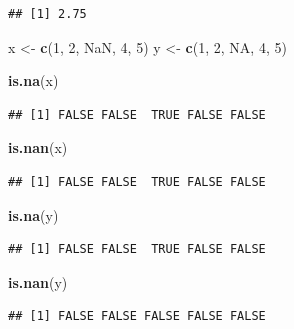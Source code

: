 \documentclass[
]{book}
\newenvironment{Shaded}{\begin{snugshade}}{\end{snugshade}}
\newcommand{\ConstantTok}[1]{\textcolor[rgb]{0.56,0.35,0.01}{#1}}
\newcommand{\DecValTok}[1]{\textcolor[rgb]{0.00,0.00,0.81}{#1}}
\newcommand{\FunctionTok}[1]{\textcolor[rgb]{0.13,0.29,0.53}{\textbf{#1}}}
\newcommand{\NormalTok}[1]{#1}
\newcommand{\OtherTok}[1]{\textcolor[rgb]{0.56,0.35,0.01}{#1}}
\theoremstyle{definition}
\theoremstyle{definition}
\theoremstyle{definition}
\theoremstyle{definition}
\theoremstyle{remark}
\begin{document}
\begin{verbatim}
## [1] 2.75
\end{verbatim}

\begin{Shaded}
\begin{Highlighting}[]
\NormalTok{x }\OtherTok{\textless{}{-}} \FunctionTok{c}\NormalTok{(}\DecValTok{1}\NormalTok{, }\DecValTok{2}\NormalTok{, }\ConstantTok{NaN}\NormalTok{, }\DecValTok{4}\NormalTok{, }\DecValTok{5}\NormalTok{)}
\NormalTok{y }\OtherTok{\textless{}{-}} \FunctionTok{c}\NormalTok{(}\DecValTok{1}\NormalTok{, }\DecValTok{2}\NormalTok{, }\ConstantTok{NA}\NormalTok{, }\DecValTok{4}\NormalTok{, }\DecValTok{5}\NormalTok{)}
    
\FunctionTok{is.na}\NormalTok{(x)  }
\end{Highlighting}
\end{Shaded}

\begin{verbatim}
## [1] FALSE FALSE  TRUE FALSE FALSE
\end{verbatim}

\begin{Shaded}
\begin{Highlighting}[]
\FunctionTok{is.nan}\NormalTok{(x) }
\end{Highlighting}
\end{Shaded}

\begin{verbatim}
## [1] FALSE FALSE  TRUE FALSE FALSE
\end{verbatim}

\begin{Shaded}
\begin{Highlighting}[]
\FunctionTok{is.na}\NormalTok{(y) }
\end{Highlighting}
\end{Shaded}

\begin{verbatim}
## [1] FALSE FALSE  TRUE FALSE FALSE
\end{verbatim}

\begin{Shaded}
\begin{Highlighting}[]
\FunctionTok{is.nan}\NormalTok{(y)}
\end{Highlighting}
\end{Shaded}

\begin{verbatim}
## [1] FALSE FALSE FALSE FALSE FALSE
\end{verbatim}
\end{document}
